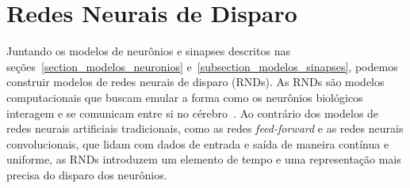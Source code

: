 \section{Redes Neurais de Disparo}

Juntando os modelos de neurônios e sinapses descritos nas seções~\ref{section_modelos_neuronios}
e~\ref{subsection_modelos_sinapses}, podemos construir modelos de redes neurais de disparo (RNDs). As RNDs são modelos
computacionais que buscam emular a forma como os neurônios biológicos interagem e se comunicam entre si no
cérebro~\cite{maassNetworks1997}. Ao contrário dos modelos de redes neurais artificiais tradicionais, como as redes
\emph{feed-forward} e as redes neurais convolucionais, que lidam com dados de entrada e saída de maneira contínua e uniforme, as
RNDs introduzem um elemento de tempo e uma representação mais precisa do disparo dos neurônios.




